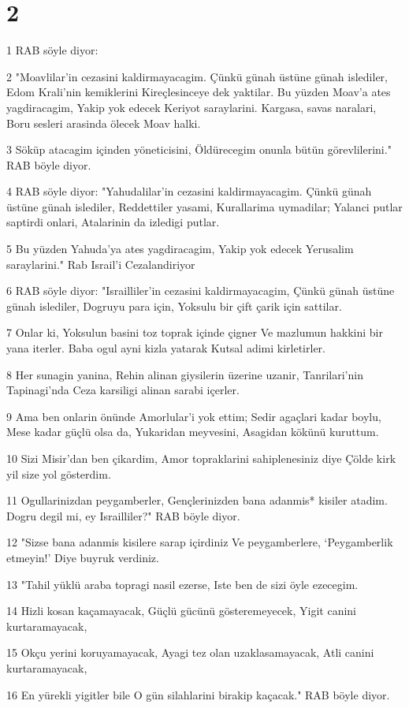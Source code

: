 \chapter{2}

\par 1 RAB söyle diyor:
\par 2 "Moavlilar'in cezasini kaldirmayacagim. Çünkü günah üstüne günah islediler, Edom Krali'nin kemiklerini Kireçlesinceye dek yaktilar. Bu yüzden Moav'a ates yagdiracagim, Yakip yok edecek Keriyot saraylarini. Kargasa, savas naralari, Boru sesleri arasinda ölecek Moav halki.
\par 3 Söküp atacagim içinden yöneticisini, Öldürecegim onunla bütün görevlilerini." RAB böyle diyor.
\par 4 RAB söyle diyor: "Yahudalilar'in cezasini kaldirmayacagim. Çünkü günah üstüne günah islediler, Reddettiler yasami, Kurallarima uymadilar; Yalanci putlar saptirdi onlari, Atalarinin da izledigi putlar.
\par 5 Bu yüzden Yahuda'ya ates yagdiracagim, Yakip yok edecek Yerusalim saraylarini." Rab Israil'i Cezalandiriyor
\par 6 RAB söyle diyor: "Israilliler'in cezasini kaldirmayacagim, Çünkü günah üstüne günah islediler, Dogruyu para için, Yoksulu bir çift çarik için sattilar.
\par 7 Onlar ki, Yoksulun basini toz toprak içinde çigner Ve mazlumun hakkini bir yana iterler. Baba ogul ayni kizla yatarak Kutsal adimi kirletirler.
\par 8 Her sunagin yanina, Rehin alinan giysilerin üzerine uzanir, Tanrilari'nin Tapinagi'nda Ceza karsiligi alinan sarabi içerler.
\par 9 Ama ben onlarin önünde Amorlular'i yok ettim; Sedir agaçlari kadar boylu, Mese kadar güçlü olsa da, Yukaridan meyvesini, Asagidan kökünü kuruttum.
\par 10 Sizi Misir'dan ben çikardim, Amor topraklarini sahiplenesiniz diye Çölde kirk yil size yol gösterdim.
\par 11 Ogullarinizdan peygamberler, Gençlerinizden bana adanmis* kisiler atadim. Dogru degil mi, ey Israilliler?" RAB böyle diyor.
\par 12 "Sizse bana adanmis kisilere sarap içirdiniz Ve peygamberlere, `Peygamberlik etmeyin!' Diye buyruk verdiniz.
\par 13 "Tahil yüklü araba topragi nasil ezerse, Iste ben de sizi öyle ezecegim.
\par 14 Hizli kosan kaçamayacak, Güçlü gücünü gösteremeyecek, Yigit canini kurtaramayacak,
\par 15 Okçu yerini koruyamayacak, Ayagi tez olan uzaklasamayacak, Atli canini kurtaramayacak,
\par 16 En yürekli yigitler bile O gün silahlarini birakip kaçacak." RAB böyle diyor.

